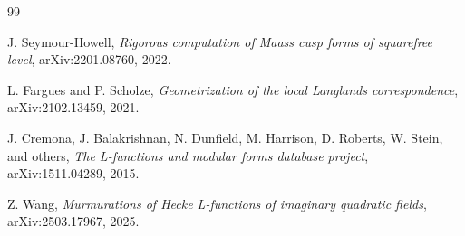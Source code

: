 \documentclass[11pt]{article}
\begin{document}
\begin{thebibliography}{99}

J. Seymour-Howell,
\emph{Rigorous computation of Maass cusp forms of squarefree level},
arXiv:2201.08760, 2022.

L. Fargues and P. Scholze,
\emph{Geometrization of the local Langlands correspondence},
arXiv:2102.13459, 2021.

J. Cremona, J. Balakrishnan, N. Dunfield, M. Harrison, D. Roberts, W. Stein, and others,
\emph{The L-functions and modular forms database project},
arXiv:1511.04289, 2015.

Z. Wang,
\emph{Murmurations of Hecke L-functions of imaginary quadratic fields},
arXiv:2503.17967, 2025.

\end{thebibliography}
\end{document}
